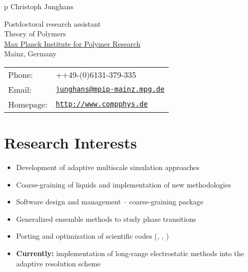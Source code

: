 \documentclass{article}
\begin{document}
\begin{tabular}{p{\textwidth}}
{\huge Christoph Junghans}\\
\hline
\end{tabular}
\vspace{0.25in}

\begin{minipage}{0.45\linewidth}
  Postdoctoral research assistant\\
  Theory of Polymers\\
  \href{http://www.mpip-mainz.mpg.de}{Max Planck Institute for Polymer Research} \\
  Mainz, Germany
\end{minipage}
\begin{minipage}{0.45\linewidth}
  \begin{tabular}{ll}
    Phone: & ++49-(0)6131-379-335 \\
    Email: & \href{mailto:junghans@mpip-mainz.mpg.de}{\tt junghans@mpip-mainz.mpg.de} \\
    Homepage: & \href{http://www.comppyhs.de}{\tt http://www.compphys.de} \\
  \end{tabular}
\end{minipage}

\section*{Research Interests}
\begin{itemize}
\setlength{\itemsep}{0pt}
\setlength{\parskip}{0pt}
\setlength{\parsep}{0pt}
\item Development of adaptive multiscale simulation approaches
\item Coarse-graining of liquids and implementation of new methodologies
\item Software design and management -- coarse-graining package 
\item Generalized ensemble methods to study phase transitions
\item Porting and optimization of scientific codes (, , )
\item \textbf{Currently:} implementation of long-range electrostatic methods into the adaptive resolution scheme
\end{itemize}
\end{document}
